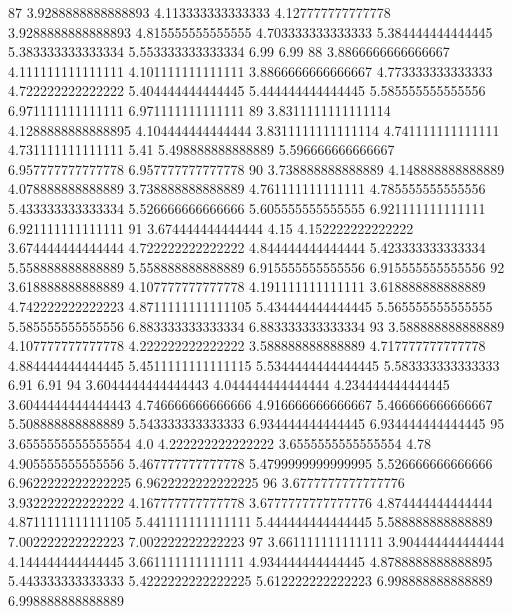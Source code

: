 87 3.9288888888888893 4.113333333333333 4.127777777777778 3.9288888888888893 4.815555555555555 4.703333333333333 5.384444444444445 5.383333333333334 5.553333333333334 6.99 6.99
88 3.8866666666666667 4.111111111111111 4.101111111111111 3.8866666666666667 4.773333333333333 4.722222222222222 5.404444444444445 5.444444444444445 5.585555555555556 6.971111111111111 6.971111111111111
89 3.8311111111111114 4.1288888888888895 4.104444444444444 3.8311111111111114 4.741111111111111 4.731111111111111 5.41 5.498888888888889 5.596666666666667 6.957777777777778 6.957777777777778
90 3.738888888888889 4.148888888888889 4.078888888888889 3.738888888888889 4.761111111111111 4.785555555555556 5.433333333333334 5.526666666666666 5.605555555555555 6.921111111111111 6.921111111111111
91 3.674444444444444 4.15 4.152222222222222 3.674444444444444 4.722222222222222 4.844444444444444 5.423333333333334 5.558888888888889 5.558888888888889 6.915555555555556 6.915555555555556
92 3.618888888888889 4.107777777777778 4.191111111111111 3.618888888888889 4.742222222222223 4.8711111111111105 5.434444444444445 5.565555555555555 5.585555555555556 6.883333333333334 6.883333333333334
93 3.588888888888889 4.107777777777778 4.222222222222222 3.588888888888889 4.717777777777778 4.884444444444445 5.4511111111111115 5.5344444444444445 5.583333333333333 6.91 6.91
94 3.6044444444444443 4.044444444444444 4.234444444444445 3.6044444444444443 4.746666666666666 4.916666666666667 5.466666666666667 5.508888888888889 5.543333333333333 6.934444444444445 6.934444444444445
95 3.6555555555555554 4.0 4.222222222222222 3.6555555555555554 4.78 4.905555555555556 5.467777777777778 5.4799999999999995 5.526666666666666 6.9622222222222225 6.9622222222222225
96 3.6777777777777776 3.932222222222222 4.167777777777778 3.6777777777777776 4.874444444444444 4.8711111111111105 5.441111111111111 5.444444444444445 5.588888888888889 7.002222222222223 7.002222222222223
97 3.661111111111111 3.904444444444444 4.144444444444445 3.661111111111111 4.934444444444445 4.8788888888888895 5.443333333333333 5.4222222222222225 5.612222222222223 6.998888888888889 6.998888888888889
